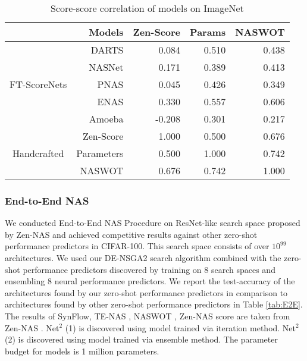 \documentclass[lettersize,journal]{IEEEtran}
\begin{document}
            \begin{table}
                \caption{Score-score correlation of models on ImageNet}
                \label{tab:score_accuracy_correlation_imagenet}
                \centering
                \begin{tabular}{c|r|rrr}
                \toprule
                    & Models & Zen-Score & Params & NASWOT\\
                    \midrule
                     \multirow{5}{*}{FT-ScoreNets} &DARTS & 0.084 & 0.510 & 0.438 \\
                    &NASNet & 0.171 & 0.389 & 0.413 \\
                    &PNAS & 0.045 & 0.426 & 0.349 \\
                    &ENAS & 0.330 & 0.557 & 0.606 \\
                    &Amoeba & -0.208 & 0.301 & 0.217 \\

                    \midrule
                    \multirow{3}{*}{Handcrafted}&Zen-Score \cite{Zen-NAS} & 1.000 & 0.500 & 0.676 \\
                    &Parameters & 0.500 & 1.000 & 0.742 \\
                    &NASWOT \cite{naswot} & 0.676 & 0.742 & 1.000 \\
                \bottomrule
              \end{tabular}
            \end{table}

        \subsubsection{End-to-End NAS} \label{sec:E2ENAS}
            We conducted End-to-End NAS Procedure on ResNet-like search space proposed by Zen-NAS and achieved competitive results against other zero-shot performance predictors in CIFAR-100. This search space consists of over $10^{99}$ architectures. We used our DE-NSGA2 search algorithm combined with the zero-shot performance predictors discovered by training on 8 search spaces and ensembling 8 neural performance predictors. We report the test-accuracy of the architectures found by our zero-shot performance predictors in comparison to architectures found by other zero-shot performance predictors in Table \ref{tab:E2E}. The results of SynFlow, TE-NAS \cite{TE-NAS}, NASWOT \cite{naswot}, Zen-NAS score are taken from Zen-NAS \cite{Zen-NAS}. Net$^2$ (1) is discovered using model trained via iteration method. Net$^2$ (2) is discovered using model trained via ensemble method. The parameter budget for models is 1 million parameters.
\end{document}
